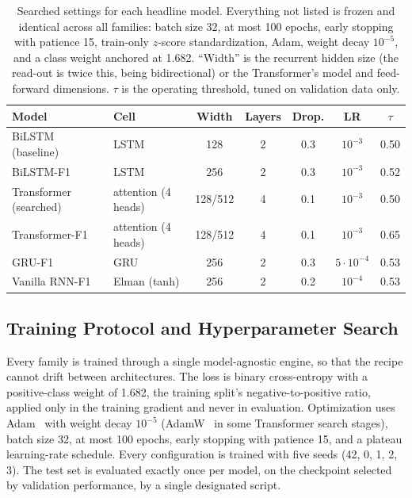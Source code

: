\documentclass[mti,article,submit,moreauthors]{Definitions/mdpi}
\begin{document}
\begin{table}[H]
\caption{Searched settings for each headline model. Everything not listed is frozen and identical across all families: batch size 32, at most 100 epochs, early stopping with patience 15, train-only $z$-score standardization, Adam, weight decay $10^{-5}$, and a class weight anchored at 1.682. ``Width'' is the recurrent hidden size (the read-out is twice this, being bidirectional) or the Transformer's model and feed-forward dimensions. $\tau$ is the operating threshold, tuned on validation data only.\label{tab:hparams}}
\begin{tabularx}{\textwidth}{Xlccccc}
\toprule
\textbf{Model} & \textbf{Cell} & \textbf{Width} & \textbf{Layers} & \textbf{Drop.} & \textbf{LR} & \textbf{$\tau$}\\
\midrule
BiLSTM (baseline) & LSTM & 128 & 2 & 0.3 & $10^{-3}$ & 0.50\\
BiLSTM-F1 & LSTM & 256 & 2 & 0.3 & $10^{-3}$ & 0.52\\
Transformer (searched) & attention (4 heads) & 128/512 & 4 & 0.1 & $10^{-3}$ & 0.50\\
Transformer-F1 & attention (4 heads) & 128/512 & 4 & 0.1 & $10^{-3}$ & 0.65\\
GRU-F1 & GRU & 256 & 2 & 0.3 & $5{\cdot}10^{-4}$ & 0.53\\
Vanilla RNN-F1 & Elman (tanh) & 256 & 2 & 0.2 & $10^{-4}$ & 0.53\\
\bottomrule
\end{tabularx}
\end{table}

\subsection{Training Protocol and Hyperparameter Search}
\label{sec:training}

Every family is trained through a single model-agnostic engine, so that the recipe cannot drift between architectures. The loss is binary cross-entropy with a positive-class weight of 1.682, the training split's negative-to-positive ratio, applied only in the training gradient and never in evaluation. Optimization uses Adam~\citep{kingma2015adam} with weight decay $10^{-5}$ (AdamW~\citep{loshchilov2019adamw} in some Transformer search stages), batch size 32, at most 100 epochs, early stopping with patience 15, and a plateau learning-rate schedule. Every configuration is trained with five seeds (42, 0, 1, 2, 3). The test set is evaluated exactly once per model, on the checkpoint selected by validation performance, by a single designated script.
\end{document}
